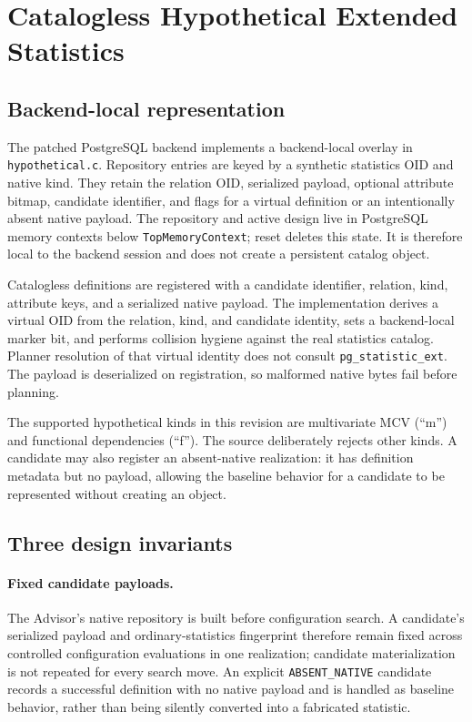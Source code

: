 \section{Catalogless Hypothetical Extended Statistics}

\subsection{Backend-local representation}

The patched PostgreSQL backend implements a backend-local overlay in
\texttt{hypothetical.c}. Repository entries are keyed
by a synthetic statistics OID and native kind. They retain the relation OID,
serialized payload, optional attribute bitmap, candidate identifier, and flags
for a virtual definition or an intentionally absent native payload. The
repository and active design live in PostgreSQL memory contexts below
\texttt{TopMemoryContext}; reset deletes this state. It is therefore local to
the backend session and does not create a persistent catalog object.

Catalogless definitions are registered with a candidate identifier, relation,
kind, attribute keys, and a serialized native payload. The implementation
derives a virtual OID from the relation, kind, and candidate identity, sets a
backend-local marker bit, and performs collision hygiene against the real
statistics catalog. Planner resolution of that virtual identity does not
consult \texttt{pg\_statistic\_ext}. The payload is deserialized on
registration, so malformed native bytes fail before planning.

The supported hypothetical kinds in this revision are multivariate MCV
(``m'') and functional dependencies (``f''). The source deliberately rejects
other kinds. A candidate may also register an absent-native realization: it
has definition metadata but no payload, allowing the baseline behavior for a
candidate to be represented without creating an object.

\subsection{Three design invariants}

\paragraph{Fixed candidate payloads.}
The Advisor's native repository is built before configuration search. A
candidate's serialized payload and ordinary-statistics fingerprint therefore
remain fixed across controlled configuration evaluations in one realization;
candidate materialization is not repeated for every search move. An explicit
\texttt{ABSENT\_NATIVE} candidate records a successful definition with no
native payload and is handled as baseline behavior, rather than being silently
converted into a fabricated statistic.

